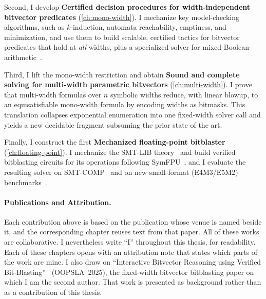 \noindent Second, I develop \textbf{Certified decision procedures for width-independent bitvector predicates} (\cref{ch:mono-width}).
I mechanize key model-checking algorithms, such as $k$-induction, automata reachability, emptiness, and
minimization, and use them to build scalable, certified tactics for
bitvector predicates that hold at \emph{all} widths, plus a specialized
solver for mixed Boolean-arithmetic~\citep{liu2021mba,reichenwallner2022efficient}.

\noindent Third, I lift the mono-width restriction and obtain \textbf{Sound and complete solving for multi-width parametric bitvectors} (\cref{ch:multi-width}).
I prove that multi-width formulas over $n$ symbolic widths reduce, with linear blowup, to an equisatisfiable mono-width formula by encoding widths as bitmasks.
This translation collapses exponential enumeration into one fixed-width solver call and yields a new decidable fragment subsuming the prior state of the art.

\noindent Finally, I construct the first \textbf{Mechanized floating-point bitblaster} (\cref{ch:floating-point}).
I mechanize the SMT-LIB \qffp{} theory~\citep{extrealsemantics} and build verified bitblasting circuits for its operations
following SymFPU~\citep{symfpu}, and I evaluate the resulting solver on SMT-COMP~\citep{smtcomp2024} and on new
small-format (E4M3/E5M2) benchmarks~\citep{fp8fordl}.

\paragraph{Publications and Attribution.}
Each contribution above is based on the publication whose venue is named beside it,
and the corresponding chapter reuses text from that paper.
All of these works are collaborative.
I nevertheless write ``I'' throughout this thesis, for readability.
Each of these chapters opens with an attribution note that states which parts of the work are mine.
I also draw on ``Interactive Bitvector Reasoning using Verified Bit-Blasting''~\citep{leanbv} (OOPSLA~2025),
the fixed-width bitvector bitblasting paper on which I am the second author.
That work is presented as background rather than as a contribution of this thesis.

